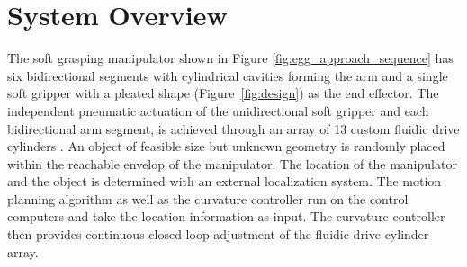 \section{System Overview}
The soft grasping manipulator shown in Figure \ref{fig:egg_approach_sequence} has six bidirectional segments with cylindrical cavities forming the arm and a single soft gripper with a pleated shape (Figure~\ref{fig:design}) as the end effector. 
The independent pneumatic actuation of the unidirectional soft gripper and each bidirectional arm segment, is achieved through an array of 13 custom fluidic drive cylinders \cite{marchese2014design}.
An object of feasible size but unknown geometry is randomly placed within the reachable envelop of the manipulator.  
The location of the manipulator and the object is determined with an external localization system. 
The motion planning algorithm as well as the curvature controller run on the control computers and take the location information as input.
The curvature controller then provides continuous closed-loop adjustment of the fluidic drive cylinder array.




